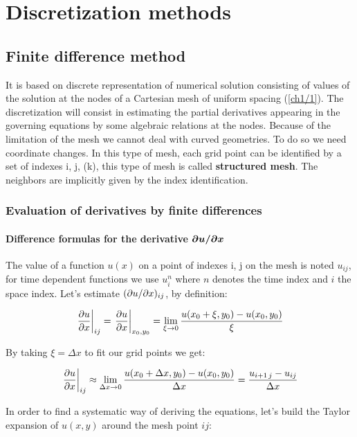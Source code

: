 
\chapter{Discretization methods}
\section{Finite difference method}
It is based on discrete representation of numerical solution consisting of values of the solution at the nodes of a Cartesian mesh of uniform spacing (\autoref{ch1/1}). The discretization will consist in estimating the partial derivatives appearing in the governing equations by some algebraic relations at the nodes. Because of the limitation of the mesh we cannot deal with curved geometries. To do so we need coordinate changes. In this type of mesh, each grid point can be identified by a set of indexes i, j, (k), this type of mesh is called \textbf{structured mesh}. The neighbors are implicitly given by the index identification. 

\subsection{Evaluation of derivatives by finite differences}
\subsubsection{Difference formulas for the derivative $\bm{\partial u / \partial x}$}
The value of a function $u(x)$ on a point of indexes i, j on the mesh is noted $u_{ij}$, for time dependent functions we use $u^n_i$ where $n$ denotes the time index and $i$ the space index. Let's estimate $(\partial u / \partial x)_{ij}$, by definition: 

\begin{equation}
\left.\frac{\partial u }{\partial x}\right| _{ij} = \left.\frac{\partial u }{\partial x}\right| _{x_0,y_0}= \lim _{\xi \rightarrow 0} \frac{u(x_0+\xi, y_0) - u(x_0,y_0)}{\xi}  
\end{equation}

By taking $\xi = \Delta x$ to fit our grid points we get: 

\begin{equation}
\left.\frac{\partial u }{\partial x}\right| _{ij} \approx \lim _{\Delta x \rightarrow 0} \frac{u(x_0+\Delta x, y_0) - u(x_0,y_0)}{\Delta x}= \frac{u_{i+1\, j} - u_{ij}}{\Delta x}  
\end{equation}

In order to find a systematic way of deriving the equations, let's build the Taylor expansion of $u(x,y)$ around the mesh point $ij$: 


